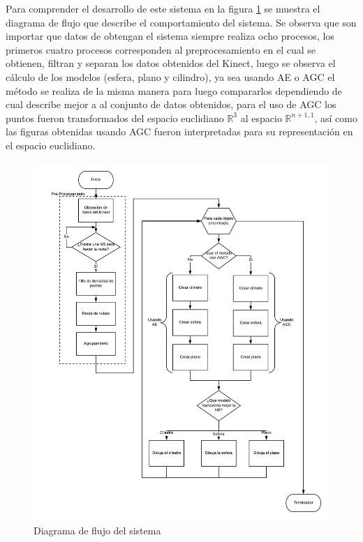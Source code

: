         
    Para comprender el desarrollo de este \gls{sistema} en la figura \ref{fig:mainDiagram} se muestra el diagrama de flujo que describe el comportamiento del sistema. Se observa que son importar que datos de obtengan el sistema siempre realiza ocho procesos, los primeros cuatro procesos corresponden al preprocesamiento en el cual se obtienen, filtran y separan los datos obtenidos del Kinect, luego se observa el cálculo de los modelos (esfera, plano y cilindro), ya sea usando AE o AGC el método se realiza de la misma manera para luego compararlos dependiendo de cual describe mejor a al conjunto de datos obtenidos, para el uso de AGC los puntos fueron transformados del espacio euclidiano $\mathbb{R}^{3}$ al espacio $\mathbb{R}^{n+1,1}$, así como las figuras obtenidas usando AGC fueron interpretadas para su representación en el espacio euclidiano.
    \clearpage
    \begin{figure}[!htb]
       	\centering
       	\includegraphics[width=\textwidth]{02Desarrollo/RANSAC/imagenes/MainGiagram2.jpeg}
       	\caption{Diagrama de flujo del sistema} 
       	\label{fig:mainDiagram}
    \end{figure}
